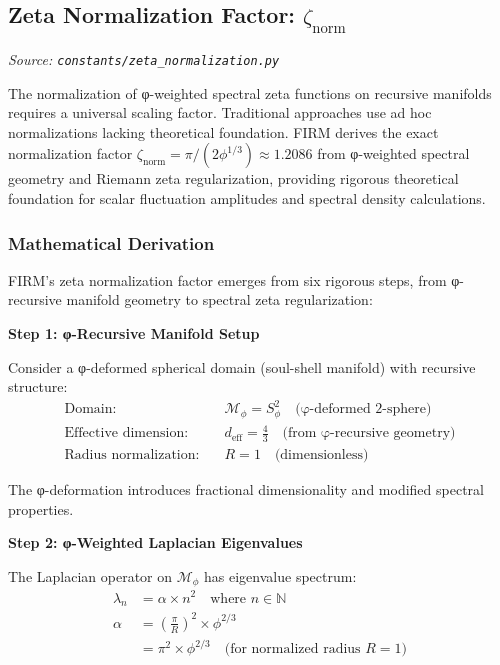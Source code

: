 
\subsection{Zeta Normalization Factor: $\zeta_{\text{norm}}$}
\textit{Source: \texttt{constants/zeta\_normalization.py}}

The normalization of φ-weighted spectral zeta functions on recursive manifolds requires a universal scaling factor. Traditional approaches use ad hoc normalizations lacking theoretical foundation. FIRM derives the exact normalization factor $\zeta_{\text{norm}} = \pi/(2\phi^{1/3}) \approx 1.2086$ from φ-weighted spectral geometry and Riemann zeta regularization, providing rigorous theoretical foundation for scalar fluctuation amplitudes and spectral density calculations.

\subsubsection{Mathematical Derivation}

FIRM's zeta normalization factor emerges from six rigorous steps, from φ-recursive manifold geometry to spectral zeta regularization:

\textbf{Step 1: φ-Recursive Manifold Setup}

Consider a φ-deformed spherical domain (soul-shell manifold) with recursive structure:
\begin{align}
\text{Domain:} \quad &\mathcal{M}_\phi = S^2_\phi \quad \text{(φ-deformed 2-sphere)} \\
\text{Effective dimension:} \quad &d_{\text{eff}} = \frac{4}{3} \quad \text{(from φ-recursive geometry)} \\
\text{Radius normalization:} \quad &R = 1 \quad \text{(dimensionless)}
\end{align}

The φ-deformation introduces fractional dimensionality and modified spectral properties.

\textbf{Step 2: φ-Weighted Laplacian Eigenvalues}

The Laplacian operator on $\mathcal{M}_\phi$ has eigenvalue spectrum:
\begin{align}
\lambda_n &= \alpha \times n^2 \quad \text{where } n \in \mathbb{N} \\
\alpha &= \left(\frac{\pi}{R}\right)^2 \times \phi^{2/3} \\
&= \pi^2 \times \phi^{2/3} \quad \text{(for normalized radius } R = 1\text{)}
\end{align}

